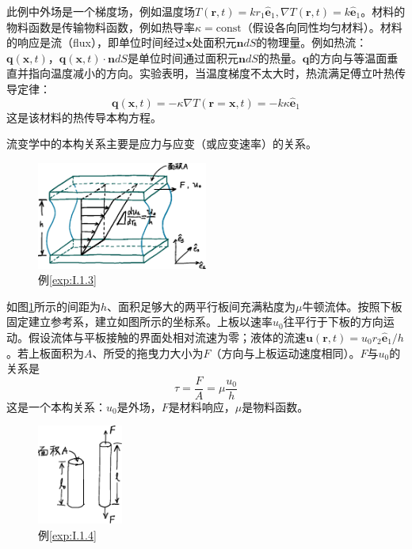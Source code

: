 \documentclass[main.tex]{subfiles}
\begin{document}
\begin{example}\label{exp:I.1.2}
此例中外场是一个梯度场，例如温度场$T\left(\mathbf{r},t\right)=kr_1\mathbf{\hat{e}}_1,\nabla T\left(\mathbf{r},t\right)=k\mathbf{\hat{e}}_1$。材料的物料函数是传输物料函数，例如热导率$\kappa=\text{const}$（假设各向同性均匀材料）。材料的响应是流（flux），即单位时间经过$\mathbf{x}$处面积元$\mathbf{n}dS$的物理量。例如热流：$\mathbf{q}\left(\mathbf{x},t\right)$，$\mathbf{q}\left(\mathbf{x},t\right)\cdot\mathbf{n}dS$是单位时间通过面积元$\mathbf{n}dS$的热量。$\mathbf{q}$的方向与等温面垂直并指向温度减小的方向。实验表明，当温度梯度不太大时，热流满足傅立叶热传导定律\cite[\S1.1.3.1,p.~9]{钟理化工原理上册2008}：
\[
\mathbf{q}\left(\mathbf{x},t\right)=-\kappa\nabla T\left(\mathbf{r}=\mathbf{x},t\right)=-k\kappa\mathbf{\hat{e}}_1
\]
这是该材料的热传导本构方程。
\end{example}

流变学中的本构关系主要是应力与应变（或应变速率）的关系。

\begin{figure}[h]
\centering
\includegraphics[width=0.5\textwidth]{images/I.1.3.eps}
\caption{例\ref{exp:I.1.3}}
\label{fig:I.1.3}
\end{figure}

\begin{example}[简单剪切下的牛顿流体本构关系]\label{exp:I.1.3}
如图\ref{fig:I.1.3}所示的间距为$h$、面积足够大的两平行板间充满粘度为$\mu$牛顿流体。按照下板固定建立参考系，建立如图所示的坐标系。上板以速率$u_0$往平行于下板的方向运动。假设流体与平板接触的界面处相对流速为零；液体的流速$\mathbf{u}\left(\mathbf{r},t\right)=u_0r_2\mathbf{\hat{e}}_1/h$。若上板面积为$A$、所受的拖曳力大小为$F$（方向与上板运动速度相同）。$F$与$u_0$的关系是
\[
\tau=\frac{F}{A}=\mu\frac{u_0}{h}
\]
这是一个本构关系：$u_0$是外场，$F$是材料响应，$\mu$是物料函数。
\end{example}

\begin{figure}[h]
\centering
\includegraphics[width=0.25\textwidth]{images/I.1.4.eps}
\caption{例\ref{exp:I.1.4}}
\label{fig:I.1.4}
\end{figure}
\end{document}
